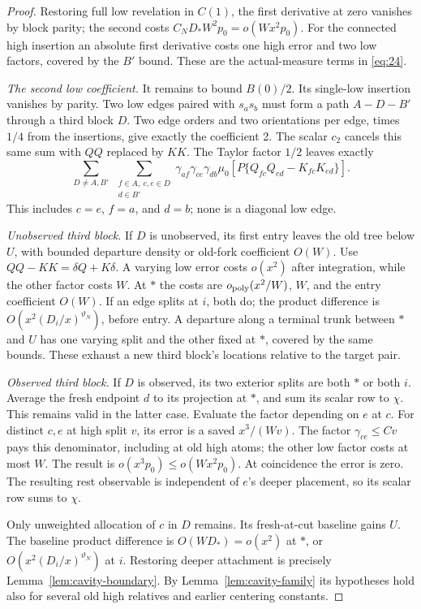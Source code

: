 \begin{proof}
Restoring full low revelation in \(C(1)\), the
first derivative at zero vanishes by block parity;
the second costs \(C_ND_*W^2p_0=o(Wx^2p_0)\).
For the connected high insertion an absolute first
derivative costs one high error and two low
factors, covered by the \(B'\) bound. These are
the actual-measure terms in \eqref{eq:24}.

\emph{The second low coefficient.}
It remains to bound \(B(0)/2\). Its single-low
insertion vanishes by parity. Two low edges paired
with \(s_as_b\) must form a path \(A-D-B'\)
through a third block \(D\). Two edge orders and
two orientations per edge, times \(1/4\) from
the insertions, give exactly the coefficient 2.
The scalar \(c_2\) cancels this same sum with
\(QQ\) replaced by \(KK\). The Taylor factor
\(1/2\) leaves exactly
\[
 \sum_{D\ne A,B'}\ \sum_{\substack{f\in A,\ c,e\in D\\d\in B'}}
 \gamma_{af}\gamma_{ce}\gamma_{db}
          \mu_0[P\{Q_{fc}Q_{ed}-K_{fc}K_{ed}\}].
\]
This includes \(c=e\), \(f=a\), and \(d=b\);
none is a diagonal low edge.

\emph{Unobserved third block.}
If \(D\) is unobserved, its first entry leaves the
old tree below \(U\), with bounded departure
density or old-fork coefficient \(O(W)\).
Use \(QQ-KK=\delta Q+K\delta\).
A varying low error costs \(o(x^2)\) after
integration, while the other factor costs \(W\).
At \(*\) the costs are
\(o_{\rm poly}(x^2/W)\), \(W\), and the entry
coefficient \(O(W)\). If an edge splits at \(i\),
both do; the product difference is
\(O(x^2(D_i/x)^{\vartheta_N})\), before entry.
A departure along a terminal trunk between
\(*\) and \(U\) has one varying split and the
other fixed at \(*\), covered by the same
bounds. These exhaust a new third block's
locations relative to the target pair.

\emph{Observed third block.}
If \(D\) is observed, its two exterior splits
are both \(*\) or both \(i\). Average the fresh
endpoint \(d\) to its projection at \(*\),
and sum its scalar row to \(\chi\). This remains
valid in the latter case. Evaluate the factor
depending on \(e\) at \(c\). For distinct \(c,e\)
at high split \(v\), its error is a saved
\(x^3/(Wv)\). The factor \(\gamma_{ce}\le Cv\)
pays this denominator, including at old high
atoms; the other low factor costs at most \(W\).
The result is \(o(x^3p_0)\le o(Wx^2p_0)\).
At coincidence the error is zero. The resulting
rest observable is independent of \(e\)'s deeper
placement, so its scalar row sums to \(\chi\).

Only unweighted allocation of \(c\) in \(D\)
remains. Its fresh-at-cut baseline gains \(U\).
The baseline product difference is \(O(WD_*)=
o(x^2)\) at \(*\), or
\(O(x^2(D_i/x)^{\vartheta_N})\) at \(i\).
Restoring deeper attachment is precisely
Lemma~\ref{lem:cavity-boundary}. By
Lemma~\ref{lem:cavity-family} its hypotheses
hold also for several old high relatives
and earlier centering constants.


\end{proof}
